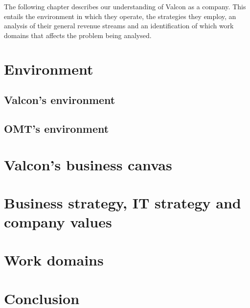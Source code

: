 The following chapter describes our understanding of Valcon as a company. This entails the environment in which they operate, the strategies they employ, an analysis of their general revenue streams and an identification of which work domains that affects the problem being analysed.

\section{Environment}
\subsection{Valcon's environment}

\subsection{OMT's environment}

\section{Valcon's business canvas}

\section{Business strategy, IT strategy and company values}

\section{Work domains}

\section{Conclusion}
